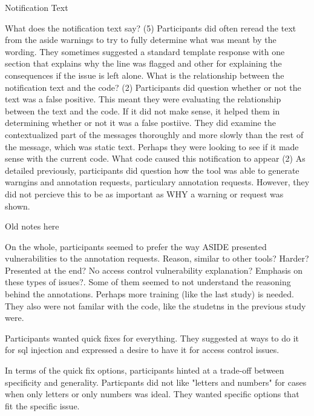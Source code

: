 \documentclass[twoside,letterpaper]{soups}
\begin{document}
Notification Text

What does the notification text say? (5) Participants did often reread the text from the aside warnings to try to fully determine what was meant by the wording. They sometimes suggested a standard template response with one section that explains why the line was flagged and other for explaining the consequences if the issue is left alone.
What is the relationship between the notification text and the code?
(2) Participants did question whether or not the text was a false positive. This meant they were evaluating the relationship between the text and the code. If it did not make sense, it helped them in determining whether or not it was a false postiive. They did examine the contextualized part of the messages thoroughly and more slowly than the rest of the message, which was static text. Perhaps they were looking to see if it made sense with the current code.
What code caused this notification to appear (2) As detailed previously, participants did question how the tool was able to generate warngins and annotation requests, particulary annotation requests. However, they did not percieve this to be as important as WHY a warning or request was shown.















Old notes here

On the whole, participants seemed to prefer the way ASIDE presented vulnerabilities to the annotation requests. Reason, similar to other tools? Harder? Presented at the end? No access control vulnerability explanation? Emphasis on these types of issues?. Some of them seemed to not understand the reasoning behind the annotations. Perhaps more training (like the last study) is needed. They also were not familar with the code, like the studetns in the previous study were.

Participants wanted quick fixes for everything. They suggested at ways to do it for sql injection and expressed a desire to have it for access control issues.

In terms of the quick fix options, participants hinted at a trade-off between specificity and generality. Particpants did not like "letters and numbers" for cases when only letters or only numbers was ideal. They wanted specific options that fit the specific issue.
 
\end{document}

